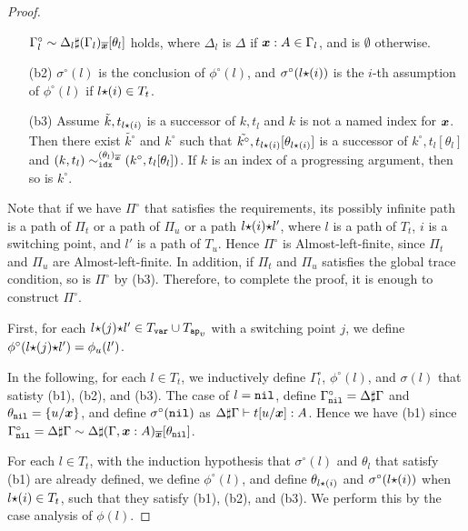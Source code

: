 \begin{proof}
\begin{itemize}
    $\Gamma^\circ_l \sim \Delta_l\sharp(\Gamma_l)_{\overline{\boldsymbol{x}}}[\theta_l]$ holds,
    where $\Delta_l$ is $\Delta$ if $\boldsymbol{x}:A\in\Gamma_l$, and is $\emptyset$ otherwise. 
  \item[(b2)]
    $\sigma^\circ(l)$ is the conclusion of $\phi^\circ(l)$,
    and $\sigma^\circ(l{\star}(i))$ is the $i$-th assumption of $\phi^\circ(l)$ if $l{\star}(i) \in T_t$.
  \item[(b3)]
    Assume $\tilde{k},t_{l{\star}(i)}$ is a successor of $k,t_l$ and $k$ is not a named index for $\boldsymbol{x}$. 
    Then there exist $\tilde{k^\circ}$ and $k^\circ$ such that
    $\tilde{k^\circ},t_{l{\star}(i)}[\theta_{l{\star}(i)}]$ is a successor of $k^\circ,t_l[\theta_l]$ and 
    $(k,t_l) \sim^{(\theta_l)_{\overline{\boldsymbol{x}}}}_{{\tt idx}} (k^\circ,t_l[\theta_l])$.
    If $k$ is an index of a progressing argument, then so is $k^\circ$.    
  \end{itemize}
  
  Note that if we have $\Pi^\circ$ that satisfies the requirements, its possibly infinite path
  is a path of $\Pi_t$ or a path of $\Pi_u$ or a path $l{\star}(i){\star} l'$,
  where $l$ is a path of $T_t$, $i$ is a switching point, and $l'$ is a path of $T_u$.
  Hence $\Pi^\circ$ is Almost-left-finite, since $\Pi_t$ and $\Pi_u$ are Almost-left-finite.
  In addition, if $\Pi_t$ and $\Pi_u$ satisfies the global trace condition,
  so is $\Pi^\circ$ by (b3). 
  Therefore, to complete the proof, it is enough to construct $\Pi^\circ$. 

  First, for each $l\conc(j)\conc l'\in T_\var\cup T_\apvar$ with a switching point $j$, 
  we define $\phi^\circ(l{\star}(j){\star} l') = \phi_u(l')$. 

  In the following, for each $l\in T_t$, we inductively define $\Gamma^\circ_l$, $\phi^\circ(l)$, and $\sigma(l)$
  that satisty (b1), (b2), and (b3).
  The case of $l={\tt nil}$, define $\Gamma^\circ_{\tt nil} = \Delta\sharp\Gamma$ and $\theta_{\tt nil}=\{u/\boldsymbol{x}\}$,
  and define $\sigma^\circ({\tt nil})$ as $\Delta\sharp\Gamma\vdash t[u/\boldsymbol{x}]:A$. 
  Hence we have (b1) since
  $\Gamma^\circ_{\tt nil} = \Delta\sharp\Gamma \sim \Delta\sharp(\Gamma,\boldsymbol{x}:A)_{\overline{\boldsymbol{x}}}[\theta_{\tt nil}]$. 

  For each $l\in T_t$,
  with the induction hypothesis that $\sigma^\circ(l)$ 
  and $\theta_l$ that satisfy (b1) are already defined, 
  we define $\phi^\circ(l)$, and define $\theta_{l{\star}(i)}$ 
  and $\sigma^\circ(l{\star}(i))$ when $l{\star}(i)\in T_t$, 
  such that they satisfy (b1), (b2), and (b3). 
  We perform this by the case analysis of $\phi(l)$.


\end{proof}
